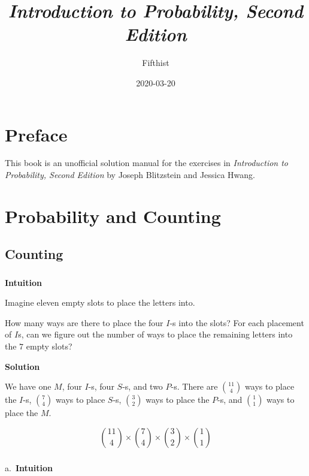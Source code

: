 \documentclass[]{book}
\title{\emph{Introduction to Probability, Second Edition}}
\author{Fifthist}
\date{2020-03-20}
\begin{document}
\maketitle

{
\setcounter{tocdepth}{1}
\tableofcontents
}
\chapter*{Preface}\label{preface}

This book is an unofficial solution manual for the exercises in
\emph{Introduction to Probability, Second Edition} by Joseph Blitzstein
and Jessica Hwang.

\chapter{Probability and Counting}\label{probability-and-counting}

\section{Counting}\label{counting}

\subsection{}\label{section}

\textbf{Intuition}

Imagine eleven empty slots to place the letters into.

How many ways are there to place the four \(I\)-s into the slots? For
each placement of \(I\)s, can we figure out the number of ways to place
the remaining letters into the \(7\) empty slots?

 \textbf{Solution}

We have one \(M\), four \(I\)-s, four \(S\)-s, and two \(P\)-s. There
are \({11 \choose 4}\) ways to place the \(I\)-s, \({7 \choose 4}\) ways
to place \(S\)-s, \({3 \choose 2}\) ways to place the \(P\)-s, and
\({1 \choose 1}\) ways to place the \(M\).

\[ {11 \choose 4} \times {7 \choose 4} \times {3 \choose 2} \times {1 \choose 1} \]

\subsection{}\label{section-1}

a.~\textbf{Intuition}
\end{document}
